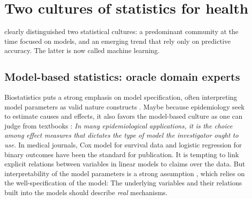 \documentclass[french,12pt,twoside,a4paper]{book}
\begin{document}
\section{Two cultures of statistics for health}\label{sec:intro:two_cultures}

\cite{breiman2001statistical} clearly distinguished two statistical cultures: a
predominant community at the time focused on models, and an emerging trend that
rely only on predictive accuracy. The latter is now called machine learning.

\subsection{Model-based statistics: oracle domain experts}%
\label{subsec:intro:biostatistics_framework}

Biostatistics puts a strong emphasis on model specification, often interpreting
model parameters as valid nature constructs \citep{cox2001statistical}. Maybe because
epidemiology seek to estimate causes and effects, it also favors the model-based
culture as one can judge from textbooks \citep{rothman2012epidemiology}:
\textit{In many epidemiological applications, it is the choice among effect
  measures that dictates the type of model the investigator ought to use.} In
medical journals, Cox model for survival data and logistic regression for binary
outcomes have been the standard for publication. %
It is tempting to link explicit relations between variables in linear models to
claims over the data. But interpretability of the model parameters is a strong
assumption \citep{lipton2018mythos}, which relies on the well-specification of
the model: The underlying variables and their relations built into the models
should describe \emph{real} mechanisms.

\end{document}
